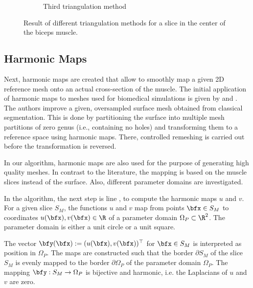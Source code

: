 \begin{figure}
\begin{subfigure}[t]{0.31\textwidth}
    \caption{Third triangulation method}%
    \label{fig:triangulation_2}%
  \end{subfigure}
  \caption{Result of different triangulation methods for a slice in the center of the biceps muscle.}%
  \label{fig:triangulations}%
\end{figure}%

\subsection{Harmonic Maps}

Next, harmonic maps are created that allow to smoothly map a given 2D reference mesh onto an actual cross-section of the muscle. The initial application of harmonic maps to meshes used for biomedical simulations is given by \cite{marchandise2010quality} and \cite{Marchandise2_2011}. The authors improve a given, oversampled surface mesh obtained from classical segmentation. This is done by partitioning the surface into multiple mesh partitions of zero genus (i.e., containing no holes) and transforming them to a reference space using harmonic maps. There, controlled remeshing is carried out before the transformation is reversed.

In our algorithm, harmonic maps are also used for the purpose of generating high quality meshes. In contrast to the literature, the mapping is based on the muscle slices instead of the surface. Also, different parameter domains are investigated.

In the algorithm, the next step is line , to compute the harmonic maps $u$ and $v$. For a given slice $S_M$, the functions $u$ and $v$ map from points $\bfx \in S_M$ to coordinates $u(\bfx),v(\bfx)\in \R$ of a parameter domain $\Omega_P \subset \R^2$. The parameter domain is either a unit circle or a unit square.

The vector $\bfy(\bfx) := (u(\bfx), v(\bfx))^\top$ for $\bfx \in S_M$ is interpreted as position in $\Omega_P$. The maps are constructed such that the border $∂S_M$ of the slice $S_M$ is evenly mapped to the border $∂\Omega_P$ of the parameter domain $\Omega_P$.
The mapping $\bfy: S_M \to \Omega_P$ is bijective and harmonic, i.e. the Laplacians of $u$ and $v$ are zero.

